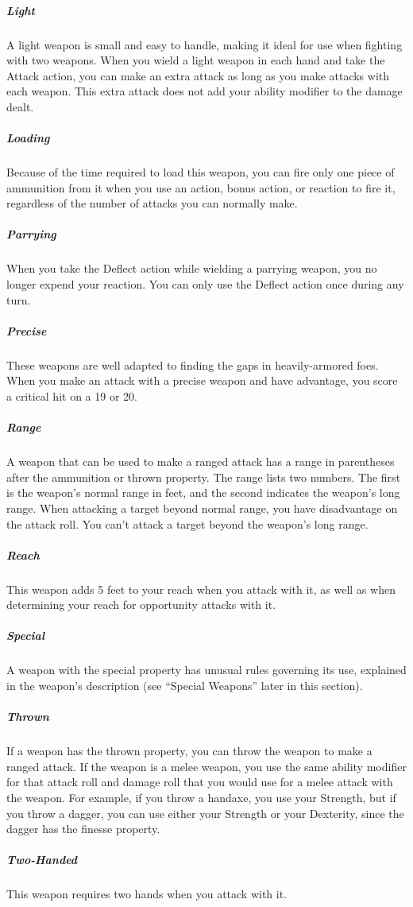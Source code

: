 \subparagraph*{Light} A light weapon is small and easy to handle, making it ideal for use when fighting with two weapons. When you wield a light weapon in each hand and take the Attack action, you can make an extra attack as long as you make attacks with each weapon. This extra attack does not add your ability modifier to the damage dealt.

\subparagraph*{Loading} Because of the time required to load this weapon, you can fire only one piece of ammunition from it when you use an action, bonus action, or reaction to fire it, regardless of the number of attacks you can normally make.

\subparagraph*{Parrying} When you take the Deflect action while wielding a parrying weapon, you no longer expend your reaction. You can only use the Deflect action once during any turn.

\subparagraph*{Precise} These weapons are well adapted to finding the gaps in heavily-armored foes. When you make an attack with a precise weapon and have advantage, you score a critical hit on a 19 or 20.

\subparagraph*{Range} A weapon that can be used to make a ranged attack has a range in parentheses after the ammunition or thrown property. The range lists two numbers. The first is the weapon's normal range in feet, and the second indicates the weapon's long range. When attacking a target beyond normal range, you have disadvantage on the attack roll. You can't attack a target beyond the weapon's long range.

\subparagraph*{Reach} This weapon adds 5 feet to your reach when you attack with it, as well as when determining your reach for opportunity attacks with it.

\subparagraph*{Special} A weapon with the special property has unusual rules governing its use, explained in the weapon's description (see “Special Weapons” later in this section).

\subparagraph*{Thrown} If a weapon has the thrown property, you can throw the weapon to make a ranged attack. If the weapon is a melee weapon, you use the same ability modifier for that attack roll and damage roll that you would use for a melee attack with the weapon. For example, if you throw a handaxe, you use your Strength, but if you throw a dagger, you can use either your Strength or your Dexterity, since the dagger has the finesse property.

\subparagraph*{Two-Handed} This weapon requires two hands when you attack with it.

